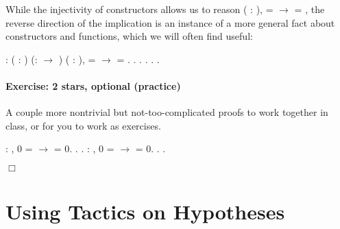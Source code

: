 \documentclass[12pt]{report}
\begin{document}
 While the injectivity of constructors allows us to reason
    \coqdockw{\ensuremath{\forall}} (  : ),   =   \ensuremath{\rightarrow}  = , the reverse direction of
    the implication is an instance of a more general fact about
    constructors and functions, which we will often find useful: \begin{coqdoccode}
\coqdocemptyline
\coqdocnoindent
{}  : \coqdockw{\ensuremath{\forall}} (  : ) (:  \ensuremath{\rightarrow} ) ( : ), \coqdoceol
\coqdocindent{2.00em}
 =  \ensuremath{\rightarrow}   =  .\coqdoceol
\coqdocnoindent
{}.       .  . . .\coqdoceol
\coqdocemptyline
\end{coqdoccode}
\paragraph{Exercise: 2 stars, optional (practice)}

 A couple more nontrivial but not-too-complicated proofs to work
    together in class, or for you to work as exercises. \begin{coqdoccode}
\coqdocemptyline
\coqdocnoindent
{}  : \coqdockw{\ensuremath{\forall}} ,\coqdoceol
\coqdocindent{1.50em}
 0  =  \ensuremath{\rightarrow}  = 0.\coqdoceol
\coqdocnoindent
{}.\coqdoceol
 .\coqdoceol
\coqdocemptyline
\coqdocnoindent
{}  : \coqdockw{\ensuremath{\forall}} ,\coqdoceol
\coqdocindent{1.50em}
  0 =  \ensuremath{\rightarrow}  = 0.\coqdoceol
\coqdocnoindent
{}.\coqdoceol
 .\coqdoceol
\end{coqdoccode}
\ensuremath{\Box} \begin{coqdoccode}
\coqdocemptyline
\end{coqdoccode}
\section{Using Tactics on Hypotheses}
\end{document}
